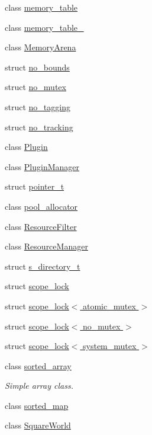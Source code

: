 \begin{DoxyCompactItemize}
\item 
class \hyperlink{classcrap_1_1memory__table}{memory\+\_\+table}
\item 
class \hyperlink{classcrap_1_1memory__table__64}{memory\+\_\+table\+\_}
\item 
class \hyperlink{classcrap_1_1_memory_arena}{Memory\+Arena}
\item 
struct \hyperlink{structcrap_1_1no__bounds}{no\+\_\+bounds}
\item 
struct \hyperlink{structcrap_1_1no__mutex}{no\+\_\+mutex}
\item 
struct \hyperlink{structcrap_1_1no__tagging}{no\+\_\+tagging}
\item 
struct \hyperlink{structcrap_1_1no__tracking}{no\+\_\+tracking}
\item 
class \hyperlink{classcrap_1_1_plugin}{Plugin}
\item 
class \hyperlink{classcrap_1_1_plugin_manager}{Plugin\+Manager}
\item 
struct \hyperlink{structcrap_1_1pointer__t}{pointer\+\_\+t}
\item 
class \hyperlink{classcrap_1_1pool__allocator}{pool\+\_\+allocator}
\item 
class \hyperlink{classcrap_1_1_resource_filter}{Resource\+Filter}
\item 
class \hyperlink{classcrap_1_1_resource_manager}{Resource\+Manager}
\item 
struct \hyperlink{structcrap_1_1s__directory__t}{s\+\_\+directory\+\_\+t}
\item 
struct \hyperlink{structcrap_1_1scope__lock}{scope\+\_\+lock}
\item 
struct \hyperlink{structcrap_1_1scope__lock_3_01atomic__mutex_01_4}{scope\+\_\+lock$<$ atomic\+\_\+mutex $>$}
\item 
struct \hyperlink{structcrap_1_1scope__lock_3_01no__mutex_01_4}{scope\+\_\+lock$<$ no\+\_\+mutex $>$}
\item 
struct \hyperlink{structcrap_1_1scope__lock_3_01system__mutex_01_4}{scope\+\_\+lock$<$ system\+\_\+mutex $>$}
\item 
class \hyperlink{classcrap_1_1sorted__array}{sorted\+\_\+array}
\begin{DoxyCompactList}\small\item\em Simple array class. \end{DoxyCompactList}\item 
class \hyperlink{classcrap_1_1sorted__map}{sorted\+\_\+map}
\item 
class \hyperlink{classcrap_1_1_square_world}{Square\+World}

\end{DoxyCompactItemize}
